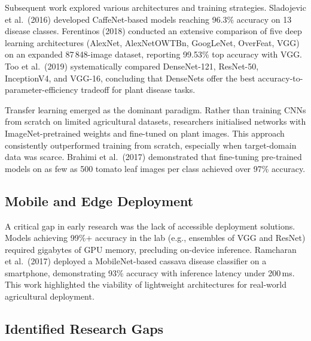 \documentclass[11pt,a4paper]{article}
\newcommand{\parsp}{\medskip}
\begin{document}
\parsp
Subsequent work explored various architectures and training strategies.
Sladojevic et al.\ (2016) developed CaffeNet-based models reaching 96.3\%
accuracy on 13 disease classes. Ferentinos (2018) conducted an extensive
comparison of five deep learning architectures (AlexNet, AlexNetOWTBn,
GoogLeNet, OverFeat, VGG) on an expanded 87\,848-image dataset, reporting
99.53\% top accuracy with VGG. Too et al.\ (2019) systematically compared
DenseNet-121, ResNet-50, InceptionV4, and VGG-16, concluding that DenseNets
offer the best accuracy-to-parameter-efficiency tradeoff for plant disease
tasks.

\parsp
Transfer learning emerged as the dominant paradigm. Rather than training CNNs
from scratch on limited agricultural datasets, researchers initialised
networks with ImageNet-pretrained weights and fine-tuned on plant images.
This approach consistently outperformed training from scratch, especially
when target-domain data was scarce. Brahimi et al.\ (2017) demonstrated that
fine-tuning pre-trained models on as few as 500 tomato leaf images per class
achieved over 97\% accuracy.

\subsection{Mobile and Edge Deployment}

A critical gap in early research was the lack of accessible deployment
solutions. Models achieving 99\%+ accuracy in the lab (e.g., ensembles of
VGG and ResNet) required gigabytes of GPU memory, precluding on-device
inference. Ramcharan et al.\ (2017) deployed a MobileNet-based cassava
disease classifier on a smartphone, demonstrating 93\% accuracy with
inference latency under 200\,ms. This work highlighted the viability of
lightweight architectures for real-world agricultural deployment.

\subsection{Identified Research Gaps}
\end{document}

